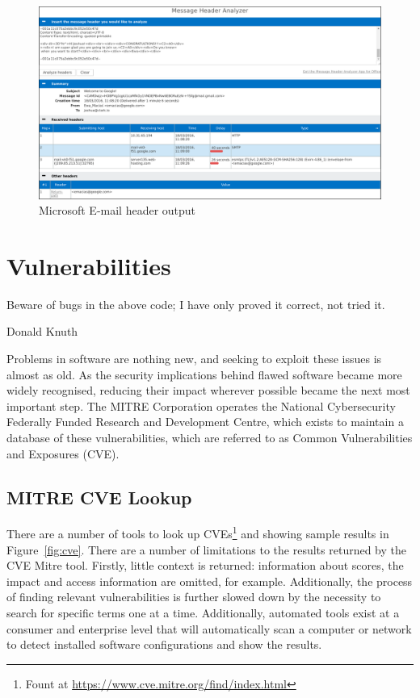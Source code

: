 \begin{figure}

	\centering \includegraphics[width=0.9\linewidth]{microsoft-header}

\caption{Microsoft E-mail header output} \label{fig:mic}\end{figure}

\section{Vulnerabilities}

\epigraph{Beware of bugs in the above code; I have only proved it correct, not
	tried it.}{Donald Knuth}

Problems in software are nothing new, and seeking to exploit these issues is
almost as old.   As the security implications behind flawed software became
more widely recognised, reducing their impact wherever possible became the next
most important step.  The MITRE Corporation operates the National Cybersecurity
Federally Funded Research and Development Centre, which exists to maintain a
database of these vulnerabilities, which are referred to as Common
Vulnerabilities and Exposures (CVE).

\subsection{MITRE CVE Lookup}\label{sec:mit}

There are a number of tools to look up CVEs\footnote{Fount at
	\url{https://www.cve.mitre.org/find/index.html}} and showing sample
results in Figure~\ref{fig:cve}.  There are a number of limitations to the
results returned by the CVE Mitre tool.  Firstly, little context is returned:
information about scores, the impact and access information are omitted, for
example.  Additionally, the process of finding relevant vulnerabilities is
further slowed down by the necessity to search for specific terms one at a
time.  Additionally, automated tools exist at a consumer and enterprise level
that will automatically scan a computer or network to detect installed software
configurations and show the results.

